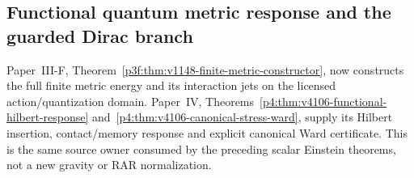 \documentclass[12pt,a4paper]{article}
\begin{document}



\subsection{Functional quantum metric response and the guarded Dirac branch}
\label{p8:sec:v2149-functional-metric-composition}
Paper~III-F, Theorem~\ref{p3f:thm:v1148-finite-metric-constructor}, now
constructs the full finite metric energy and its interaction jets on the
licensed action/quantization domain. Paper~IV,
Theorems~\ref{p4:thm:v4106-functional-hilbert-response}
and~\ref{p4:thm:v4106-canonical-stress-ward}, supply its Hilbert insertion,
contact/memory response and explicit canonical Ward certificate.
This is the same source owner consumed by the preceding scalar Einstein
theorems, not a new gravity or RAR normalization.
\end{document}
